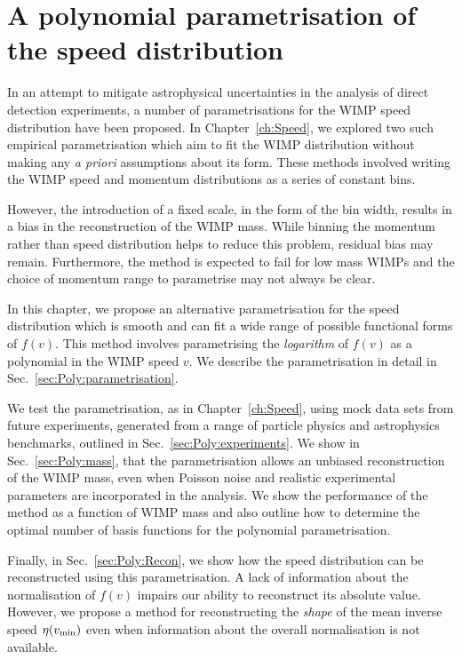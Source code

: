 \chapter[A polynomial parametrisation of the speed distribution][A polynomial parametrisation]{A polynomial parametrisation of the speed distribution}
\label{ch:Poly}


In an attempt to mitigate astrophysical uncertainties in the analysis of direct detection experiments, a number of parametrisations for the WIMP speed distribution have been proposed. In Chapter~\ref{ch:Speed}, we explored two such empirical parametrisation which aim to fit the WIMP distribution without making any \textit{a priori} assumptions about its form. These methods involved writing the WIMP speed and momentum distributions as a series of constant bins.

However, the introduction of a fixed scale, in the form of the bin width, results in a bias in the reconstruction of the WIMP mass. While binning the momentum rather than speed distribution helps to reduce this problem, residual bias may remain. Furthermore, the method is expected to fail for low mass WIMPs and the choice of momentum range to parametrise may not always be clear.

In this chapter, we propose an alternative parametrisation for the speed distribution which is smooth and can fit a wide range of possible functional forms of $f(v)$. This method involves parametrising the \textit{logarithm} of $f(v)$ as a polynomial in the WIMP speed $v$. We describe the parametrisation in detail in Sec.~\ref{sec:Poly:parametrisation}.

We test the parametrisation, as in Chapter~\ref{ch:Speed}, using mock data sets from future experiments, generated from a range of particle physics and astrophysics benchmarks, outlined in Sec.~\ref{sec:Poly:experiments}. We show in Sec.~\ref{sec:Poly:mass}, that the parametrisation allows an unbiased reconstruction of the WIMP mass, even when Poisson noise and realistic experimental parameters are incorporated in the analysis. We show the performance of the method as a function of WIMP mass and also outline how to determine the optimal number of basis functions for the polynomial parametrisation.

Finally, in Sec.~\ref{sec:Poly:Recon}, we show how the speed distribution can be reconstructed using this parametrisation. A lack of information about the normalisation of $f(v)$ impairs our ability to reconstruct its absolute value. However, we propose a method for reconstructing the \textit{shape} of the mean inverse speed $\eta(\vmin)$ even when information about the overall normalisation is not available.

